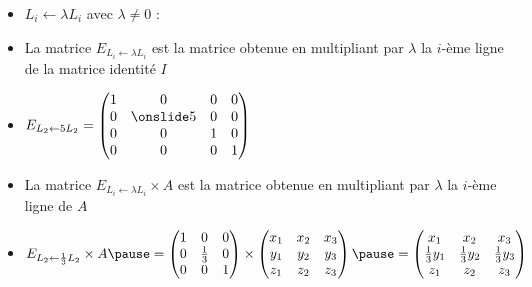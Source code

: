 \begin{frame}
\begin{itemize}\setlength{\itemsep}{8pt}
  \item $L_i \leftarrow \lambda L_i$ avec $\lambda \neq 0$ : 
\pause
  \item La matrice $E_{L_i \leftarrow \lambda L_i}$ est la matrice obtenue en 
    multipliant par $\lambda$ la $i$-ème ligne de la matrice identité $I$     
\pause
  \item  $ E_{L_2 \leftarrow 5 L_2}=
    \begin{pmatrix}
    1 & 0 & 0 & 0\\
    0 & \mathinsist{5} & 0 & 0\\
    0 & 0 & 1 & 0\\
    0 & 0 & 0 & 1\end{pmatrix}$
\pause    
  \item La matrice $E_{L_i \leftarrow \lambda L_i} \times A$ est la matrice obtenue en 
    multipliant par $\lambda$ la $i$-ème ligne de $A$
\pause  
  \item $E_{L_2 \leftarrow \frac13 L_2}  \times A
  \pause
= \begin{pmatrix}
  1&0&0\\0&\frac13&0\\0&0&1  
  \end{pmatrix}
  \times
  \begin{pmatrix}
  x_1&x_2&x_3\\y_1&y_2&y_3\\z_1&z_2&z_3  
  \end{pmatrix}
  \pause
  =   \begin{pmatrix}
  x_1&x_2&x_3\\ \frac13y_1&\frac13y_2&\frac13y_3\\z_1&z_2&z_3  
  \end{pmatrix}
$
\end{itemize}

\end{frame}



